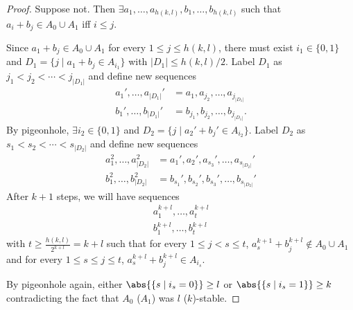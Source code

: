 \documentclass{article}
\begin{document}
\begin{proof}
  Suppose not. Then $\exists a_1, \dotsc, a_{h(k,l)}, b_1, \dotsc, b_{h(k,l)}$ such that $a_i + b_j \in A_0 \cup A_1$ iff $i \leq j$.

  \begin{center}
  \end{center}

  Since $a_1 + b_j \in A_0 \cup A_1$ for every $1 \leq j \leq h(k,l)$, there must exist $i_1 \in \{0,1\}$ and $D_1 = \{j \mid a_1 + b_j \in A_{i_1}\}$ with $|D_1| \leq h(k,l)/2$. Label $D_1$ as $j_1 < j_2 < \dotsb < j_{|D_1|}$ and define new sequences
  \begin{align*}
    a_1', \dotsc, a_{|D_1|}' &= a_1, a_{j_2}, \dotsc, a_{j_{|D_1|}} \\
    b_1', \dotsc, b_{|D_1|}' &= b_{j_1}, b_{j_2}, \dotsc, b_{j_{|D_1|}}.
  \end{align*}
  By pigeonhole, $\exists i_2 \in \{0,1\}$ and $D_2 = \{j \mid a_2' + b_j' \in A_{i_2}\}$.
  Label $D_2$ as $s_1 < s_2 < \dotsb < s_{|D_2|}$ and define new sequences
  \begin{align*}
    a_1^2 , \dotsc, a_{|D_2|}^2 &= a_1', a_2', a_{s_3}', \dotsc, a_{s_{|D_2|}}' \\
    b_1^2 , \dotsc, b_{|D_2|}^2 &= b_{s_1}', b_{s_2}', b_{s_3}', \dotsc, b_{s_{|D_2|}}'
  \end{align*}
  After $k+1$ steps, we will have sequences
  \begin{align*}
    a_1^{k+l}, \dotsc, a_t^{k+l} \\
    b_1^{k+l}, \dotsc, b_t^{k+l}
  \end{align*}
  with $t \geq \frac{h(k,l)}{2^{k+l}} = k+l$ such that for every $1 \leq j < s \leq t$, $a_s^{k+1} + b_j^{k+l} \notin A_0 \cup A_1$ and for every $1 \leq s \leq j \leq t$, $a_s^{k+l} + b_j^{k+l} \in A_{i_s}$.

  By pigeonhole again, either $\abs{\{s \mid i_s = 0\}} \geq l$ or $\abs{\{s \mid i_s = 1\}} \geq k$ contradicting the fact that $A_0$ ($A_1$) was $l$ ($k$)-stable.
\end{proof}
\end{document}
